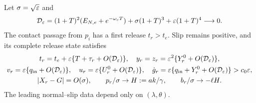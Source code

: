 \begin{theorem}
\label{thm:detuned-release}
Let $\sigma=\sqrt{\varepsilon}$ and
\begin{equation}
 \mathcal D_\varepsilon=(1+T)^2(E_{N,e}+e^{-\omega_c T})
                      +\sigma(1+T)^3+\varepsilon(1+T)^4\longrightarrow0.
 \label{ent:critical-error}
\end{equation}
The contact passage from $p_i$ has a first release $t_r>t_e$.
Slip remains positive, and its complete release state satisfies
\begin{gather}
 t_r=t_e+\varepsilon\{T+\tau_r+O(\mathcal D_\varepsilon)\},\quad
 y_r=z_r=\varepsilon^2\{Y_r^0+O(\mathcal D_\varepsilon)\},
 \label{ent:release-time-memory}\\
 v_r=\varepsilon\{q_{\rm in}+O(\mathcal D_\varepsilon)\},\quad
 u_r=\varepsilon\{U_r^0+O(\mathcal D_\varepsilon)\},\quad
 \dot g_r=\varepsilon\{q_{\rm in}+Y_r^0+O(\mathcal D_\varepsilon)\}>c_0\varepsilon,
 \label{ent:actual-release}\\
 |X_r-G|=O(\sigma),\qquad
 p_r/\sigma\to H:=ak/\gamma,\qquad b_r/\sigma\to-\ell H.
 \label{ent:release-slow}
\end{gather}
The leading normal--slip data depend only on $(\lambda,\theta)$.
\end{theorem}
